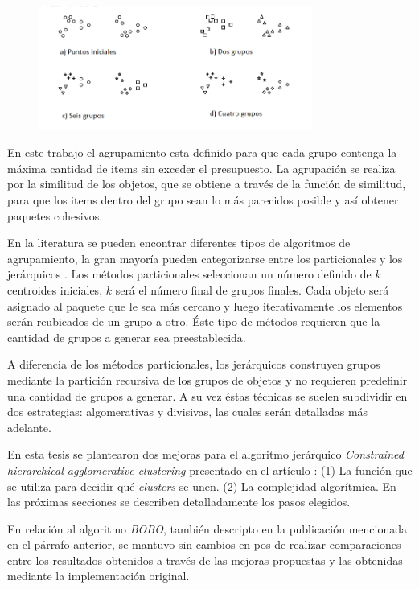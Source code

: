 \begin{figure}[H]
  \centering
   \includegraphics[width=0.8\textwidth]{img/howToCluster.png}
   \caption{}
   \label{res:img-howToCluster}
\end{figure}
En este trabajo el agrupamiento esta definido para que cada grupo contenga la máxima cantidad de items sin exceder el presupuesto. La agrupación se realiza por la similitud de los objetos, que se obtiene a través de la función de similitud, para que los items dentro del grupo sean lo más parecidos posible y así obtener paquetes cohesivos.

En la literatura se pueden encontrar diferentes tipos de algoritmos de agrupamiento, la gran mayoría pueden categorizarse entre los particionales y los jerárquicos \cite{opac-b1087461}. Los métodos particionales seleccionan un número definido de $k$ centroides iniciales, $k$ será el número final de grupos finales. Cada objeto será asignado al paquete que le sea más cercano y luego iterativamente los elementos serán reubicados de un grupo a otro. Éste tipo de métodos requieren que la cantidad de grupos a generar sea preestablecida. 

A diferencia de los métodos particionales, los jerárquicos construyen grupos mediante la partición recursiva de los grupos de objetos y no requieren predefinir una cantidad de grupos a generar. A su vez éstas técnicas se suelen subdividir en dos estrategias: algomerativas y divisivas, las cuales serán detalladas más adelante.

En esta tesis se plantearon dos mejoras para el algoritmo jerárquico \textit{Constrained hierarchical agglomerative clustering} presentado en el artículo \cite{journals/tkde/Amer-YahiaBCFMZ14}: (1) La función que se utiliza para decidir qué \textit{clusters} se unen. (2) La complejidad algorítmica. En las próximas secciones se describen detalladamente los pasos elegidos.

En relación al algoritmo \textit{BOBO}, también descripto en la publicación mencionada en el párrafo anterior, se mantuvo sin cambios en pos de realizar comparaciones entre los resultados obtenidos a través de las mejoras propuestas y las obtenidas mediante la implementación original.

